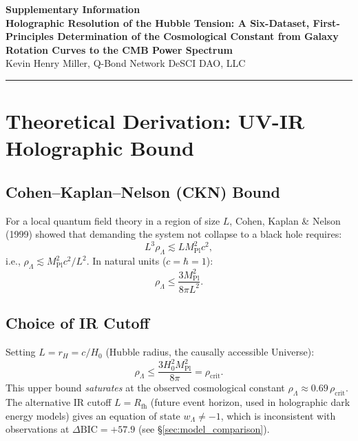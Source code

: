 \documentclass[12pt,a4paper]{article}
\begin{document}
\begin{center}
{\Large\bfseries Supplementary Information}\\[0.6em]
{\large\bfseries Holographic Resolution of the Hubble Tension: A Six-Dataset,
First-Principles Determination of the Cosmological Constant
from Galaxy Rotation Curves to the CMB Power Spectrum}\\[0.4em]
{\normalsize Kevin Henry Miller, Q-Bond Network DeSCI DAO, LLC}
\end{center}

\noindent\rule{\linewidth}{0.5pt}
\tableofcontents
\clearpage

\section{Theoretical Derivation: UV-IR Holographic Bound}
\label{sec:theory}

\subsection{Cohen--Kaplan--Nelson (CKN) Bound}

For a local quantum field theory in a region of size $L$, Cohen, Kaplan \&
Nelson (1999) showed that demanding the system not collapse to a black hole
requires:
\begin{equation}
L^3 \rho_\Lambda \lesssim L M_\mathrm{Pl}^2 c^2,
\end{equation}
i.e., $\rho_\Lambda \lesssim M_\mathrm{Pl}^2 c^2 / L^2$.
In natural units ($c = \hbar = 1$):
\begin{equation}
\rho_\Lambda \leq \frac{3 M_\mathrm{Pl}^2}{8\pi L^2}.
\end{equation}

\subsection{Choice of IR Cutoff}

Setting $L = r_H = c/H_0$ (Hubble radius, the causally accessible
Universe):
\begin{equation}
\rho_\Lambda \leq \frac{3 H_0^2 M_\mathrm{Pl}^2}{8\pi} = \rho_\mathrm{crit}.
\end{equation}
This upper bound \emph{saturates} at the observed cosmological constant
$\rho_\Lambda \approx 0.69\,\rho_\mathrm{crit}$.
The alternative IR cutoff $L = R_\mathrm{fh}$ (future event horizon,
used in holographic dark energy models) gives an equation of state
$w_\Lambda \neq -1$, which is inconsistent with observations at
$\Delta\mathrm{BIC} = +57.9$ (see \S\ref{sec:model_comparison}).
\end{document}
